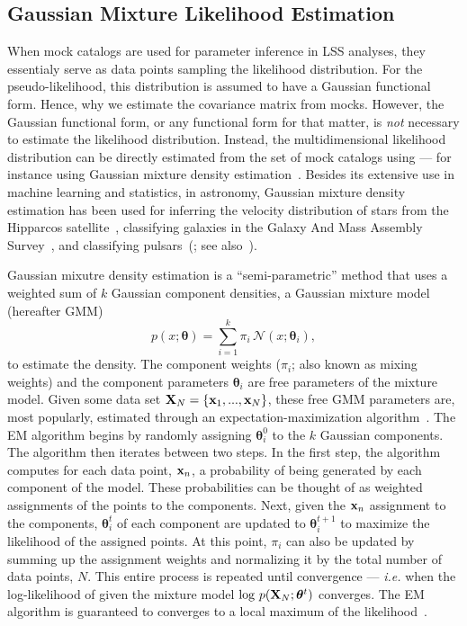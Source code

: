 \documentclass[12pt, letterpaper, preprint]{aastex}
\newcommand{\beq}{\begin{equation}}
\newcommand{\eeq}{\end{equation}}
\begin{document}
\subsection{Gaussian Mixture Likelihood Estimation} \label{sec:gmm}
When mock catalogs are used for parameter inference in LSS analyses, 
they essentialy serve as data points sampling the likelihood distribution. 
For the pseudo-likelihood, this distribution is assumed to have a 
Gaussian functional form. Hence, why we estimate the covariance matrix 
from mocks. However, the Gaussian functional form, or any functional form for 
that matter, is \emph{not} necessary to estimate the likelihood distribution. 
Instead, the multidimensional likelihood distribution 
can be directly estimated from the set of mock catalogs using --- for 
instance using Gaussian mixture density 
estimation~\citep{Press:1992:NRC:148286,9780471006268}. 
Besides its extensive use in machine learning and statistics, 
in astronomy, Gaussian mixture density estimation has been used for 
inferring the velocity distribution of stars from the Hipparcos 
satellite~\citep{bovy2011}, classifying galaxies in the Galaxy And Mass Assembly 
Survey~\citep{taylor2015}, and classifying pulsars~(\citealt{lee2012}; see
also~\citealt{hogg2010,kuhn2017}). 

Gaussian mixutre density estimation is a ``semi-parametric'' method 
that uses a weighted sum of $k$ Gaussian component densities, a Gaussian 
mixture model (hereafter GMM)
\beq
p(x; \bm{\theta}) = \sum\limits_{i=1}^{k} \pi_i\, \mathcal{N}(x; \bm{\theta}_i),
\eeq
to estimate the density. 
The component weights ($\pi_i$; also known as mixing weights) and the 
component parameters $\bm{\theta}_i$ are free parameters of the mixture 
model. Given some data set ${\bf X}_N = \{{\bf x}_1,..., {\bf x}_N \}$, 
these free GMM parameters are, most popularly, estimated 
through an expectation-maximization algorithm~\citep[EM;][]{dempster1977, neal1998}.
The EM algorithm begins by randomly assigning $\bm{\theta}^0_i$ to the 
$k$ Gaussian components. The algorithm then iterates between two steps. 
In the first step, the algorithm computes for each data point, ${\bf x}_n$, 
a probability of being generated by each component of the model. These 
probabilities can be thought of as weighted assignments of the points 
to the components. Next, given the ${\bf x}_n$ assignment to the 
components, $\bm{\theta}^t_i$ of each component are updated to $\bm{\theta}^{t+1}_i$
to maximize the likelihood of the assigned points. At this point, $\pi_i$ 
can also be updated by summing up the assignment weights and 
normalizing it by the total number of data points, $N$. This entire
process is repeated until convergence --- \emph{i.e.} when the log-likelihood of 
given the mixture model $\log\,p({\bf X}_N; \bm{\theta}^t)$ %
converges. The EM algorithm is guaranteed to converges to a local maximum 
of the likelihood~\citep{wu1983}. 
\end{document}
